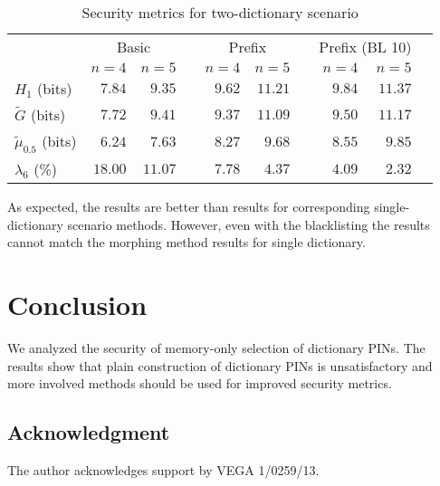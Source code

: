 \documentclass[a4paper, 11pt]{article}
\newcommand{\ra}[1]{\renewcommand{\arraystretch}{#1}}
\begin{document}
\begin{table*}[h]\centering
\ra{1.2}
\begin{tabular}{@{}lrrrrrrrrr@{}}\toprule
 & \multicolumn{2}{c}{Basic} &\phantom{a} & \multicolumn{2}{c}{Prefix} &\phantom{a} & \multicolumn{2}{c}{Prefix (BL 10)} \\
   \cmidrule{2-3} \cmidrule{5-6} \cmidrule{8-9}
 & $n=4$ & $n=5$ && $n=4$ & $n=5$ && $n=4$ & $n=5$ \\ 
\midrule
$H_1$ (bits)              & $7.84$  & $9.35$  && $9.62$ & $11.21$ && $9.84$ & $11.37$ \\
$\tilde G$  (bits)        & $7.72$  & $9.41$  && $9.37$ & $11.09$ && $9.50$ & $11.17$ \\
$\tilde \mu_{0.5}$ (bits) & $6.24$  & $7.63$  && $8.27$ &  $9.68$ && $8.55$ & $9.85$ \\
$\lambda_{6}$ (\%)        & $18.00$ & $11.07$ && $7.78$ &  $4.37$ && $4.09$ & $2.32$ \\
\bottomrule
\end{tabular}
\caption{Security metrics for two-dictionary scenario}\label{tab5}
\end{table*}

As expected, the results are better than results for corresponding single-dictionary scenario methods. 
However, even with the blacklisting the results cannot match the morphing method results for single
dictionary.


\section{Conclusion}

We analyzed the security of memory-only selection of dictionary PINs. The results show that
plain construction of dictionary PINs is unsatisfactory and more involved methods should be used for 
improved security metrics.

\subsection*{Acknowledgment} The author acknowledges support by VEGA 1/0259/13. 
\end{document}
